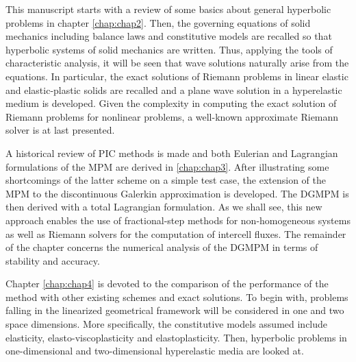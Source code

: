 This manuscript starts with a review of some basics about general hyperbolic problems in chapter \ref{chap:chap2}.
Then, the governing equations of solid mechanics including balance laws and constitutive models are recalled so that hyperbolic systems of solid mechanics are written.
Thus, applying the tools of characteristic analysis, it will be seen that wave solutions naturally arise from the equations. %
In particular, the exact solutions of Riemann problems in linear elastic and elastic-plastic solids are recalled and a plane wave solution in a hyperelastic medium is developed.
Given the complexity in computing the exact solution of Riemann problems for nonlinear problems, a well-known approximate Riemann solver is at last presented.


A historical review of PIC methods is made and both Eulerian and Lagrangian formulations of the MPM are derived in \ref{chap:chap3}.
After illustrating some shortcomings of the latter scheme on a simple test case, the extension of the MPM to the discontinuous Galerkin approximation is developed.
The DGMPM is then derived with a total Lagrangian formulation.
As we shall see, this new approach enables the use of fractional-step methods for non-homogeneous systems as well as Riemann solvers for the computation of intercell fluxes.
The remainder of the chapter concerns the numerical analysis of the DGMPM in terms of stability and accuracy.


Chapter \ref{chap:chap4} is devoted to the comparison of the performance of the method with other existing schemes and exact solutions.
To begin with, problems falling in the linearized geometrical framework will be considered in one and two space dimensions.
More specifically, the constitutive models assumed include elasticity, elasto-viscoplasticity and elastoplasticity.
Then, hyperbolic problems in one-dimensional and two-dimensional hyperelastic media are looked at.

